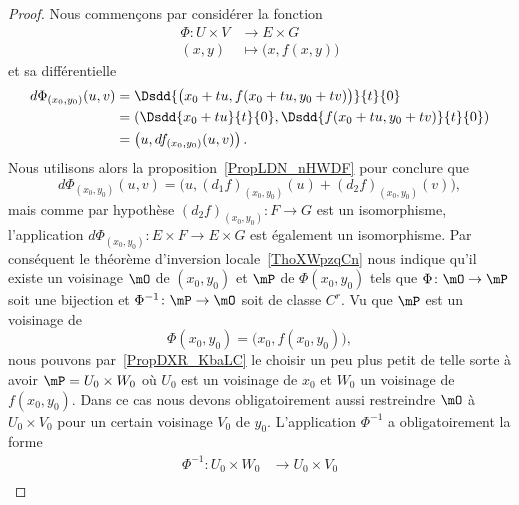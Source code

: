 \begin{proof}
    Nous commençons par considérer la fonction
    \begin{equation}
        \begin{aligned}
            \Phi\colon U\times V&\to E\times G \\
            (x,y)&\mapsto \big( x,f(x,y) \big)
        \end{aligned}
    \end{equation}
    et sa différentielle
    \begin{subequations}
        \begin{align}
            d\Phi_{(x_0,y_0)}(u,v)&=\Dsdd{ \big( x_0+tu,f(x_0+tu,y_0+tv) \big) }{t}{0}\\
            &=\left( \Dsdd{ x_0+tu }{t}{0},\Dsdd{ f(x_0+tu,y_0+tv) }{t}{0} \right)\\
            &=\left( u,df_{(x_0,y_0)}(u,v) \right).
        \end{align}
    \end{subequations}
    Nous utilisons alors la proposition~\ref{PropLDN_nHWDF} pour conclure que
    \begin{equation}
        d\Phi_{(x_0,y_0)}(u,v)=\big( u,(d_1f)_{(x_0,y_0)}(u)+(d_2f)_{(x_0,y_0)}(v) \big),
    \end{equation}
    mais comme par hypothèse \( (d_2f)_{(x_0,y_0)}\colon F\to G\) est un isomorphisme, l'application \( d\Phi_{(x_0,y_0)}\colon E\times F\to E\times G\) est également un isomorphisme. Par conséquent le théorème d'inversion locale~\ref{ThoXWpzqCn} nous indique qu'il existe un voisinage \( \mO\) de \( (x_0,y_0)\) et \( \mP\) de \( \Phi(x_0,y_0)\) tels que \( \Phi\colon \mO\to \mP\) soit une bijection et \( \Phi^{-1}\colon \mP\to \mO\) soit de classe \( C^r\). Vu que \( \mP\) est un voisinage de
    \begin{equation}
        \Phi(x_0,y_0)=\big( x_0,f(x_0,y_0) \big),
    \end{equation}
    nous pouvons par~\ref{PropDXR_KbaLC} le choisir un peu plus petit de telle sorte à avoir \( \mP=U_0\times W_0\) où \( U_0\) est un voisinage de \( x_0\) et \( W_0\) un voisinage de \( f(x_0,y_0)\). Dans ce cas nous devons obligatoirement aussi restreindre \( \mO\) à \( U_0\times V_0\) pour un certain voisinage \( V_0\) de \( y_0\). L'application \( \Phi^{-1}\) a obligatoirement la forme
    \begin{equation}    \label{EqMHT_QrHRn}
        \begin{aligned}
            \Phi^{-1}\colon U_0\times W_0&\to U_0\times V_0 \\

\end{aligned}
\end{equation}
\end{proof}
